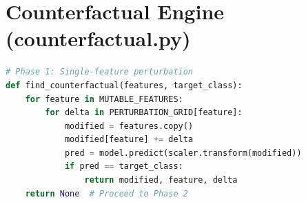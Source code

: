 \documentclass[12pt,a4paper]{report}
\begin{document}
\section{Counterfactual Engine (counterfactual.py)}
\begin{lstlisting}[language=Python]
# Phase 1: Single-feature perturbation
def find_counterfactual(features, target_class):
    for feature in MUTABLE_FEATURES:
        for delta in PERTURBATION_GRID[feature]:
            modified = features.copy()
            modified[feature] += delta
            pred = model.predict(scaler.transform(modified))
            if pred == target_class:
                return modified, feature, delta
    return None  # Proceed to Phase 2
\end{lstlisting}
\end{document}
